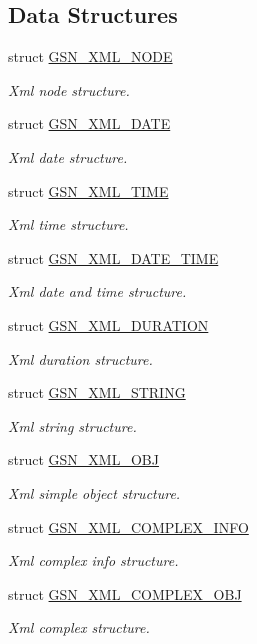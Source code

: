 \subsection*{Data Structures}
\begin{DoxyCompactItemize}
\item 
struct \hyperlink{a00434}{GSN\_\-XML\_\-NODE}
\begin{DoxyCompactList}\small\item\em Xml node structure. \end{DoxyCompactList}\item 
struct \hyperlink{a00431}{GSN\_\-XML\_\-DATE}
\begin{DoxyCompactList}\small\item\em Xml date structure. \end{DoxyCompactList}\item 
struct \hyperlink{a00437}{GSN\_\-XML\_\-TIME}
\begin{DoxyCompactList}\small\item\em Xml time structure. \end{DoxyCompactList}\item 
struct \hyperlink{a00432}{GSN\_\-XML\_\-DATE\_\-TIME}
\begin{DoxyCompactList}\small\item\em Xml date and time structure. \end{DoxyCompactList}\item 
struct \hyperlink{a00433}{GSN\_\-XML\_\-DURATION}
\begin{DoxyCompactList}\small\item\em Xml duration structure. \end{DoxyCompactList}\item 
struct \hyperlink{a00436}{GSN\_\-XML\_\-STRING}
\begin{DoxyCompactList}\small\item\em Xml string structure. \end{DoxyCompactList}\item 
struct \hyperlink{a00435}{GSN\_\-XML\_\-OBJ}
\begin{DoxyCompactList}\small\item\em Xml simple object structure. \end{DoxyCompactList}\item 
struct \hyperlink{a00429}{GSN\_\-XML\_\-COMPLEX\_\-INFO}
\begin{DoxyCompactList}\small\item\em Xml complex info structure. \end{DoxyCompactList}\item 
struct \hyperlink{a00430}{GSN\_\-XML\_\-COMPLEX\_\-OBJ}
\begin{DoxyCompactList}\small\item\em Xml complex structure. \end{DoxyCompactList}\end{DoxyCompactItemize}
